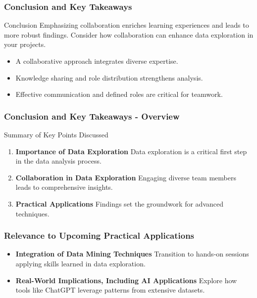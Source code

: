 \documentclass[aspectratio=169]{beamer}
\begin{document}
\begin{frame}[fragile]
    \frametitle{Conclusion and Key Takeaways}
    \begin{block}{Conclusion}
        Emphasizing collaboration enriches learning experiences and leads to more robust findings. Consider how collaboration can enhance data exploration in your projects.
    \end{block}
    \begin{itemize}
        \item A collaborative approach integrates diverse expertise.
        \item Knowledge sharing and role distribution strengthens analysis.
        \item Effective communication and defined roles are critical for teamwork.
    \end{itemize}
\end{frame}

\begin{frame}[fragile]
    \frametitle{Conclusion and Key Takeaways - Overview}
    \begin{block}{Summary of Key Points Discussed}
        \begin{enumerate}
            \item \textbf{Importance of Data Exploration}  
            Data exploration is a critical first step in the data analysis process.
            \item \textbf{Collaboration in Data Exploration}  
            Engaging diverse team members leads to comprehensive insights.
            \item \textbf{Practical Applications}  
            Findings set the groundwork for advanced techniques.
        \end{enumerate}
    \end{block}
\end{frame}

\begin{frame}[fragile]
    \frametitle{Relevance to Upcoming Practical Applications}
    \begin{itemize}
        \item \textbf{Integration of Data Mining Techniques}  
        Transition to hands-on sessions applying skills learned in data exploration.
        \item \textbf{Real-World Implications, Including AI Applications}  
        Explore how tools like ChatGPT leverage patterns from extensive datasets.
    \end{itemize}
\end{frame}
\end{document}
